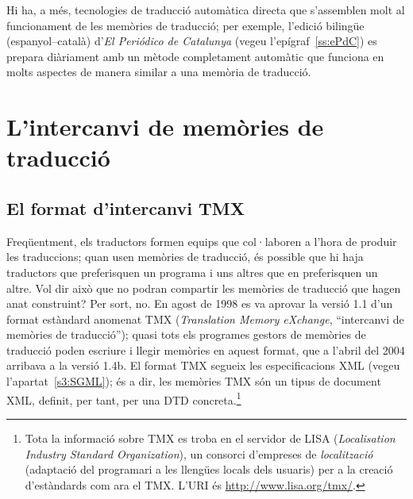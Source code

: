 Hi ha, a més, tecnologies de
traducció automàtica directa que s'assemblen molt al funcionament de
les memòries de traducció; per exemple, l'edició bilingüe
(espanyol--català) d'\emph{El Periódico de Catalunya} (vegeu
l'epígraf~\ref{ss:ePdC}) es prepara diàriament amb un mètode
completament automàtic que funciona en molts aspectes de manera
similar a una memòria de traducció.



\section{L'intercanvi de memòries de traducció}

\subsection{El format d'intercanvi TMX}


Freqüentment, els traductors formen equips que col·laboren a l'hora de
produir les traduccions; quan usen memòries de traducció, és possible
que hi haja traductors que preferisquen un programa i uns altres que
en preferisquen un altre. Vol dir això que no podran compartir les
memòries de traducció que hagen anat construint? Per sort, no. En
agost de 1998 es va aprovar la versió 1.1 d'un format estàndard
anomenat TMX (\emph{Translation Memory eXchange}, ``intercanvi de
memòries de traducció''); quasi tots els programes gestors de memòries
de traducció poden escriure i llegir memòries en aquest format, que
a l'abril del 2004 arribava a la versió 1.4b.  El format
TMX segueix les especificacions XML (vegeu l'apartat~\ref{s3:SGML});
és a dir, les memòries TMX són un tipus de document XML, definit, per
tant, per una DTD concreta.\footnote{Tota la informació sobre TMX es
  troba en el servidor de LISA (\emph{Localisation Industry Standard
    Organization}), un consorci d'empreses de \emph{localització}
  (adaptació del programari a les llengües locals dels usuaris) per a
  la creació d'estàndards com ara el TMX. L'URI és
  \url{http://www.lisa.org/tmx/}.}

